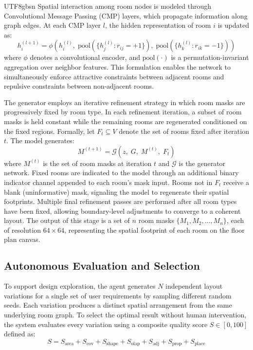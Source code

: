 \documentclass[11pt]{article}
\begin{document}
\begin{CJK}{UTF8}{gbsn}
Spatial interaction among room nodes is modeled through Convolutional Message Passing (CMP) layers, which propagate information along graph edges. At each CMP layer $l$, the hidden representation of room $i$ is updated as:
\begin{equation}
h_i^{(l+1)} = \phi\!\left(h_i^{(l)},\; \mathrm{pool}\!\left(\{h_j^{(l)} : r_{ij} = +1\}\right),\; \mathrm{pool}\!\left(\{h_k^{(l)} : r_{ik} = -1\}\right)\right)
\end{equation}
where $\phi$ denotes a convolutional encoder, and $\mathrm{pool}(\cdot)$ is a permutation-invariant aggregation over neighbor features. This formulation enables the network to simultaneously enforce attractive constraints between adjacent rooms and repulsive constraints between non-adjacent rooms.

The generator employs an iterative refinement strategy in which room masks are progressively fixed by room type. In each refinement iteration, a subset of room masks is held constant while the remaining rooms are regenerated conditioned on the fixed regions. Formally, let $F_t \subseteq V$ denote the set of rooms fixed after iteration $t$. The model generates:
\begin{equation}
M^{(t+1)} = \mathcal{G}\!\left(z,\; G,\; M^{(t)},\; F_t\right)
\end{equation}
where $M^{(t)}$ is the set of room masks at iteration $t$ and $\mathcal{G}$ is the generator network. Fixed rooms are indicated to the model through an additional binary indicator channel appended to each room's mask input. Rooms not in $F_t$ receive a blank (uninformative) mask, signaling the model to regenerate their spatial footprints. Multiple final refinement passes are performed after all room types have been fixed, allowing boundary-level adjustments to converge to a coherent layout. The output of this stage is a set of $n$ room masks $\{M_1, M_2, \ldots, M_n\}$, each of resolution $64 \times 64$, representing the spatial footprint of each room on the floor plan canvas.

\subsection*{Autonomous Evaluation and Selection}
To support design exploration, the agent generates $N$ independent layout variations for a single set of user requirements by sampling different random seeds. Each variation produces a distinct spatial arrangement from the same underlying room graph. To select the optimal result without human intervention, the system evaluates every variation using a composite quality score $S \in [0, 100]$ defined as:
\begin{equation}
S = S_{\mathrm{area}} + S_{\mathrm{cov}} + S_{\mathrm{shape}} + S_{\mathrm{olap}} + S_{\mathrm{adj}} + S_{\mathrm{prop}} + S_{\mathrm{place}}
\end{equation}


\end{CJK}
\end{document}

